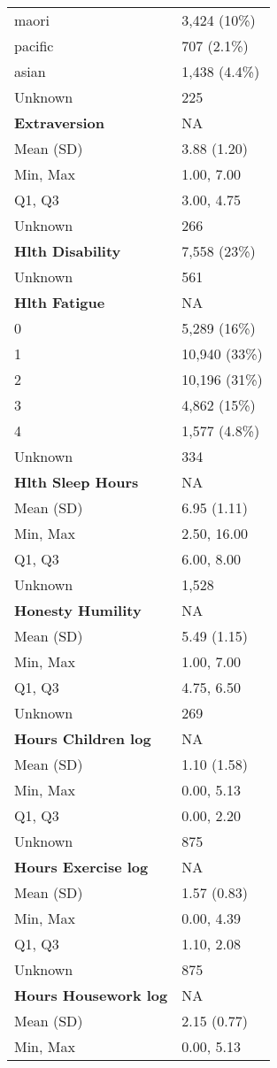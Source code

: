 \documentclass[
  single column]{article}
\begin{document}
\begin{longtable}[]{@{}ll@{}}
maori & 3,424 (10\%) \\
pacific & 707 (2.1\%) \\
asian & 1,438 (4.4\%) \\
Unknown & 225 \\
\textbf{Extraversion} & NA \\
Mean (SD) & 3.88 (1.20) \\
Min, Max & 1.00, 7.00 \\
Q1, Q3 & 3.00, 4.75 \\
Unknown & 266 \\
\textbf{Hlth Disability} & 7,558 (23\%) \\
Unknown & 561 \\
\textbf{Hlth Fatigue} & NA \\
0 & 5,289 (16\%) \\
1 & 10,940 (33\%) \\
2 & 10,196 (31\%) \\
3 & 4,862 (15\%) \\
4 & 1,577 (4.8\%) \\
Unknown & 334 \\
\textbf{Hlth Sleep Hours} & NA \\
Mean (SD) & 6.95 (1.11) \\
Min, Max & 2.50, 16.00 \\
Q1, Q3 & 6.00, 8.00 \\
Unknown & 1,528 \\
\textbf{Honesty Humility} & NA \\
Mean (SD) & 5.49 (1.15) \\
Min, Max & 1.00, 7.00 \\
Q1, Q3 & 4.75, 6.50 \\
Unknown & 269 \\
\textbf{Hours Children log} & NA \\
Mean (SD) & 1.10 (1.58) \\
Min, Max & 0.00, 5.13 \\
Q1, Q3 & 0.00, 2.20 \\
Unknown & 875 \\
\textbf{Hours Exercise log} & NA \\
Mean (SD) & 1.57 (0.83) \\
Min, Max & 0.00, 4.39 \\
Q1, Q3 & 1.10, 2.08 \\
Unknown & 875 \\
\textbf{Hours Housework log} & NA \\
Mean (SD) & 2.15 (0.77) \\
Min, Max & 0.00, 5.13 \\

\end{longtable}
\end{document}
